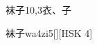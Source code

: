 \begin{entry}{袜子}{10,3}{⾐、⼦}
  \begin{phonetics}{袜子}{wa4zi5}[][HSK 4]
  \end{phonetics}
\end{entry}
